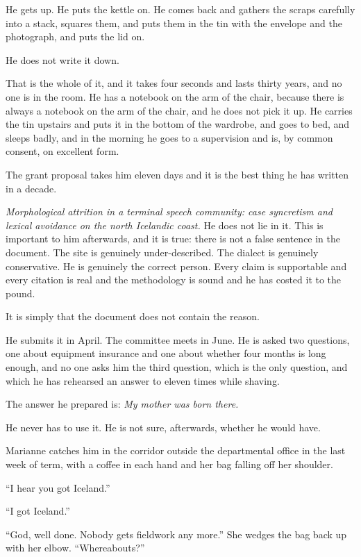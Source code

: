 \documentclass[11pt,oneside]{book}
\newcommand{\sceneline}{%
  \par\vspace{1.2em}
  \begin{center}
    \fontsize{11}{11}\selectfont \textbullet\quad\textbullet\quad\textbullet
  \end{center}
  \vspace{0.6em}\noindent\ignorespaces
}
\begin{document}
He gets up. He puts the kettle on. He comes back and gathers the scraps
carefully into a stack, squares them, and puts them in the tin with the
envelope and the photograph, and puts the lid on.

He does not write it down.

That is the whole of it, and it takes four seconds and lasts thirty
years, and no one is in the room. He has a notebook on the arm of the
chair, because there is always a notebook on the arm of the chair, and
he does not pick it up. He carries the tin upstairs and puts it in the
bottom of the wardrobe, and goes to bed, and sleeps badly, and in the
morning he goes to a supervision and is, by common consent, on
excellent form.

\sceneline

The grant proposal takes him eleven days and it is the best thing he has
written in a decade.

\emph{Morphological attrition in a terminal speech community: case
syncretism and lexical avoidance on the north Icelandic coast.} He does
not lie in it. This is important to him afterwards, and it is true: there
is not a false sentence in the document. The site is genuinely
under-described. The dialect is genuinely conservative. He is genuinely
the correct person. Every claim is supportable and every citation is
real and the methodology is sound and he has costed it to the pound.

It is simply that the document does not contain the reason.

He submits it in April. The committee meets in June. He is asked two
questions, one about equipment insurance and one about whether four
months is long enough, and no one asks him the third question, which is
the only question, and which he has rehearsed an answer to eleven times
while shaving.

The answer he prepared is: \emph{My mother was born there.}

He never has to use it. He is not sure, afterwards, whether he would
have.

\sceneline

Marianne catches him in the corridor outside the departmental office in
the last week of term, with a coffee in each hand and her bag falling
off her shoulder.

``I hear you got Iceland.''

``I got Iceland.''

``God, well done. Nobody gets fieldwork any more.'' She wedges the bag
back up with her elbow. ``Whereabouts?''
\end{document}

